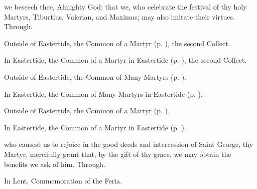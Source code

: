 \memorialCollect\label{TiburtiusCollect}
 we beseech thee, Almighty God: that we, who celebrate the festival of thy holy Martyrs, Tiburtius, Valerian, and Maximus; may also imitate their virtues. Through.



\begin{rubric}
	Outside of Eastertide, the Common of a Martyr (p. \pageref{CommonMartyr}), the second Collect.
\end{rubric}

\begin{rubric}
	In Eastertide, the Common of a Martyr in Eastertide (p. \pageref{CommonMartyrEaster}), the second Collect.
\end{rubric}



\begin{rubric}
	Outside of Eastertide, the Common of Many Martyrs (p. \pageref{CommonMartyrs}).
\end{rubric}

\begin{rubric}
	In Eastertide, the Common of Many Martyrs in Eastertide (p. \pageref{CommonMartyrsEaster}).
\end{rubric}



\begin{rubric}
	Outside of Eastertide, the Common of a Martyr (p. \pageref{CommonMartyr}).
\end{rubric}

\begin{rubric}
	In Eastertide, the Common of a Martyr in Eastertide (p. \pageref{CommonMartyrEaster}).
\end{rubric}

{} who causest us to rejoice in the good deeds and intercession of Saint George, thy Martyr, mercifully grant that, by the gift of thy grace, we may obtain the benefits we ask of him. Through.
\begin{rubric}
    In Lent, Commemoration of the Feria.%
\end{rubric}


